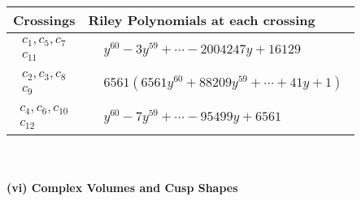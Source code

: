 \documentclass[1p]{elsarticle_modified}
\theoremstyle{definition}
\begin{document}
\begin{tabular}{m{50pt}|m{274pt}}
Crossings & \hspace{64pt}Riley Polynomials at each crossing \\
\hline $$\begin{aligned}c_{1},c_{5},c_{7}\\c_{11}\end{aligned}$$&$\begin{aligned}
&y^{60}-3 y^{59}+\cdots-2004247 y+16129
\end{aligned}$\\
\hline $$\begin{aligned}c_{2},c_{3},c_{8}\\c_{9}\end{aligned}$$&$\begin{aligned}
&6561(6561 y^{60}+88209 y^{59}+\cdots+41 y+1)
\end{aligned}$\\
\hline $$\begin{aligned}c_{4},c_{6},c_{10}\\c_{12}\end{aligned}$$&$\begin{aligned}
&y^{60}-7 y^{59}+\cdots-95499 y+6561
\end{aligned}$\\
\hline
\end{tabular}\\~\\
\newpage\flushleft \textbf{(vi) Complex Volumes and Cusp Shapes}
\end{document}

